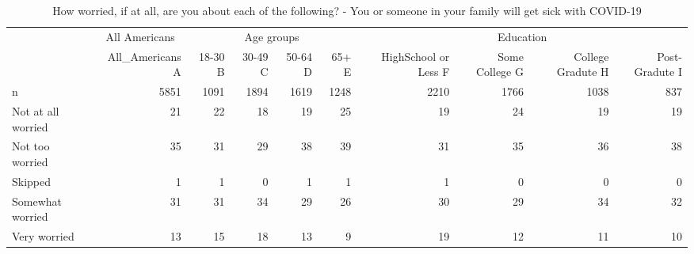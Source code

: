 \documentclass[
]{article}
\begin{document}
\begin{table}

\caption{\label{tab:unnamed-chunk-8}How worried, if at all, are you about each of the following? - You or someone in your family will get sick with COVID-19}
\fontsize{12}{14}\selectfont
\begin{tabular}[t]{l|r|r|r|r|r|r|r|r|r}
\hline
\multicolumn{1}{c|}{ } & \multicolumn{1}{c|}{All Americans} & \multicolumn{4}{c|}{Age groups} & \multicolumn{4}{c}{Education} \\
\cline{2-2} \cline{3-6} \cline{7-10}
  & All\_Americans
A & 18-30
B & 30-49
C & 50-64
D & 65+
E & HighSchool or Less
F & Some College
G & College  Gradute
H & Post-Gradute
I\\
\hline
n & 5851 & 1091 & 1894 & 1619 & 1248 & 2210 & 1766 & 1038 & 837\\
\hline
Not at all worried & 21 & 22 & 18 & 19 & 25 & 19 & 24 & 19 & 19\\
\hline
Not too worried & 35 & 31 & 29 & 38 & 39 & 31 & 35 & 36 & 38\\
\hline
Skipped & 1 & 1 & 0 & 1 & 1 & 1 & 0 & 0 & 0\\
\hline
Somewhat worried & 31 & 31 & 34 & 29 & 26 & 30 & 29 & 34 & 32\\
\hline
Very worried & 13 & 15 & 18 & 13 & 9 & 19 & 12 & 11 & 10\\
\hline
\end{tabular}
\end{table}
\end{document}
